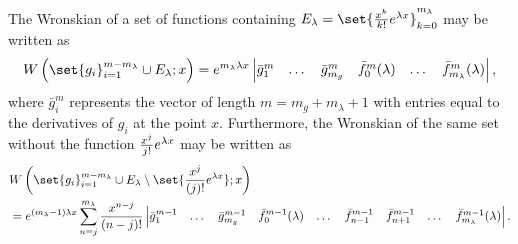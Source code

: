 \documentclass{book}
\begin{document}
\newcommand{\Wspecone}{\W{ \set{g_i}_{i=1}^{m - m_\lambda} \cup E_\lambda }{x}}
\newcommand{\Wspectwo}[1]{\W{ \set{g_i}_{i=1}^{m - m_\lambda} \cup E_\lambda \setminus \set{\poly{#1} e^{\lambda x}}}{x}}
\newcommand{\Detspec}[2]{\begin{vmatrix} \bar{g}_1^{m-1} & \dots & \bar{g}_{m_g}^{m-1} & \fmn{0}{m-1}(\lambda) & \dots & \fmn{#1 - 1}{m-1}(\lambda) & \fmn{#1 + 1}{m-1}(\lambda) & \dots & \fmn{#2}{m-1}(\lambda) \end{vmatrix}}

\begin{lemma}
The Wronskian of a set of functions containing $E_\lambda = \set{\Poly{k} e^{\lambda x}}_{k=0}^{m_\lambda}$ may be written as
\begin{equation*}
\Wspecone = e^{m_\lambda \lambda x} \begin{vmatrix} \bar{g}^m_1 & \dots & \bar{g}^m_{m_g} & \fmn{0}{m}(\lambda) & \dots & \fmn{m_\lambda}{m}(\lambda) \end{vmatrix} ,
\end{equation*}
where $\bar{g}_i^m$ represents the vector of length $m = m_g + m_\lambda +1$ with entries equal to the derivatives of $g_i$ at the point $x$.
Furthermore, the Wronskian of the same set without the function $\frac{x^j}{j!} e^{\lambda x}$ may be written as
\begin{align*}
& \Wspectwo{j} \\
& = e^{(m_\lambda - 1) \lambda x} \sum_{n=j}^{m_\lambda} \poly{n-j} \begin{vmatrix} \bar{g}^{m-1}_1 & \dots & \bar{g}^{m-1}_{m_g} & \fmn{0}{m-1}(\lambda) & \dots & \fmn{n-1}{m-1} & \fmn{n+1}{m-1} & \dots & \fmn{m_\lambda}{m-1}(\lambda) \end{vmatrix} .
\end{align*}
\end{lemma}
\end{document}
